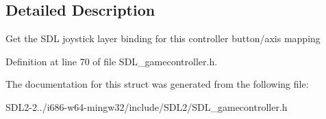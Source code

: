 \subsection{Detailed Description}
Get the S\+D\+L joystick layer binding for this controller button/axis mapping 

Definition at line 70 of file S\+D\+L\+\_\+gamecontroller.\+h.



The documentation for this struct was generated from the following file\+:\begin{DoxyCompactItemize}
\item 
S\+D\+L2-\/2../i686-\/w64-\/mingw32/include/\+S\+D\+L2/S\+D\+L\+\_\+gamecontroller.\+h\end{DoxyCompactItemize}

